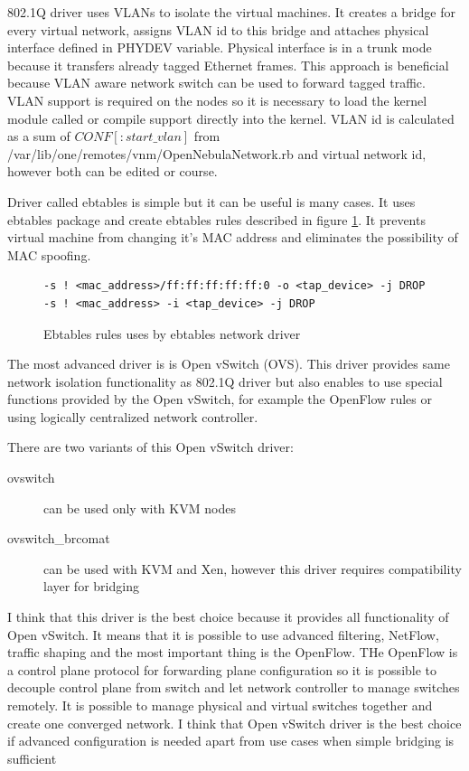 802.1Q driver uses \Ac{VLAN}s to isolate the virtual machines. It creates a bridge for every virtual network, assigns \Ac{VLAN} id to this bridge and attaches physical interface defined in PHYDEV variable. Physical interface is in a trunk mode because it transfers already tagged Ethernet frames. This approach is beneficial because \Ac{VLAN} aware network switch can be used to forward tagged traffic. \Ac{VLAN} support is required on the nodes so it is necessary to load the kernel module called  or compile support directly into the kernel. \Ac{VLAN} id is calculated as a sum of $CONF[:start\_vlan]$ from /var/lib/one/remotes/vnm/OpenNebulaNetwork.rb and virtual network id, however both can be edited or course.

Driver called ebtables is simple but it can be useful is many cases. It uses ebtables package and create ebtables rules described in figure \ref{code:ebtables}. It prevents virtual machine from changing it's \Ac{MAC} address and eliminates the possibility of \Ac{MAC} spoofing.

\begin{figure}[htb]
\caption{Ebtables rules uses by ebtables network driver}
\label{code:ebtables}
\begin{verbatim}
-s ! <mac_address>/ff:ff:ff:ff:ff:0 -o <tap_device> -j DROP
-s ! <mac_address> -i <tap_device> -j DROP
\end{verbatim}
\end{figure}

The most advanced driver is is Open vSwitch (\Ac{OVS}). This driver provides same network isolation functionality as 802.1Q driver but also enables to use special functions provided by the Open vSwitch, for example the OpenFlow rules or using logically centralized network controller.

There are two variants of this Open vSwitch driver:
\begin{description}
	\item[ovswitch] can be used only with \Ac{KVM} nodes
	\item[ovswitch\_brcomat] can be used with \Ac{KVM} and Xen, however this driver requires compatibility layer for bridging
\end{description}

I think that this driver is the best choice because it provides all functionality of Open vSwitch. It means that it is possible to use advanced filtering, NetFlow, traffic shaping and the most important thing is the OpenFlow. THe OpenFlow is a control plane protocol for forwarding plane configuration so it is possible to decouple control plane from switch and let network controller to manage switches remotely. It is possible to manage physical and virtual switches together and create one converged network. I think that Open vSwitch driver is the best choice if advanced configuration is needed apart from use cases when simple bridging is sufficient

